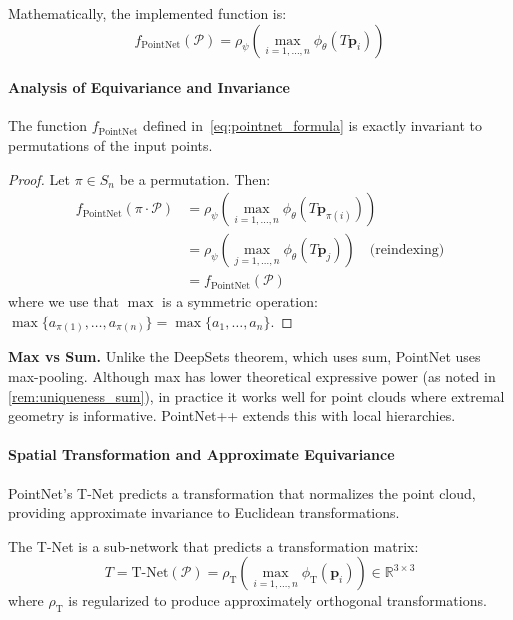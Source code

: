 Mathematically, the implemented function is:
\begin{equation}
f_{\text{PointNet}}(\mathcal{P}) = \rho_\psi\left(\max_{i=1,\ldots,n} \phi_\theta(T \mathbf{p}_i)\right)
\label{eq:pointnet_formula}
\end{equation}

\paragraph{Analysis of Equivariance and Invariance}

\begin{proposition}\label{prop:pointnet_invariance}
The function $f_{\text{PointNet}}$ defined in~\eqref{eq:pointnet_formula} is exactly invariant to permutations of the input points.
\end{proposition}

\begin{proof}
Let $\pi \in S_n$ be a permutation. Then:
\begin{align}
f_{\text{PointNet}}(\pi \cdot \mathcal{P}) &= \rho_\psi\left(\max_{i=1,\ldots,n} \phi_\theta(T \mathbf{p}_{\pi(i)})\right) \\
&= \rho_\psi\left(\max_{j=1,\ldots,n} \phi_\theta(T \mathbf{p}_j)\right) \quad \text{(reindexing)} \\
&= f_{\text{PointNet}}(\mathcal{P})
\end{align}
where we use that $\max$ is a symmetric operation: $\max\{a_{\pi(1)}, \ldots, a_{\pi(n)}\} = \max\{a_1, \ldots, a_n\}$.
\end{proof}

\textbf{Max vs Sum.} Unlike the DeepSets theorem, which uses sum, PointNet uses max-pooling. Although max has lower theoretical expressive power (as noted in \autoref{rem:uniqueness_sum}), in practice it works well for point clouds where extremal geometry is informative. PointNet++ extends this with local hierarchies.

\paragraph{Spatial Transformation and Approximate Equivariance}

PointNet's T-Net predicts a transformation that normalizes the point cloud, providing approximate invariance to Euclidean transformations.

\begin{definition}\label{def:stn_points}
The T-Net is a sub-network that predicts a transformation matrix:
\begin{equation}
T = \text{T-Net}(\mathcal{P}) = \rho_{\text{T}}\left(\max_{i=1,\ldots,n} \phi_{\text{T}}(\mathbf{p}_i)\right) \in \mathbb{R}^{3 \times 3}
\end{equation}
where $\rho_{\text{T}}$ is regularized to produce approximately orthogonal transformations.
\end{definition}

